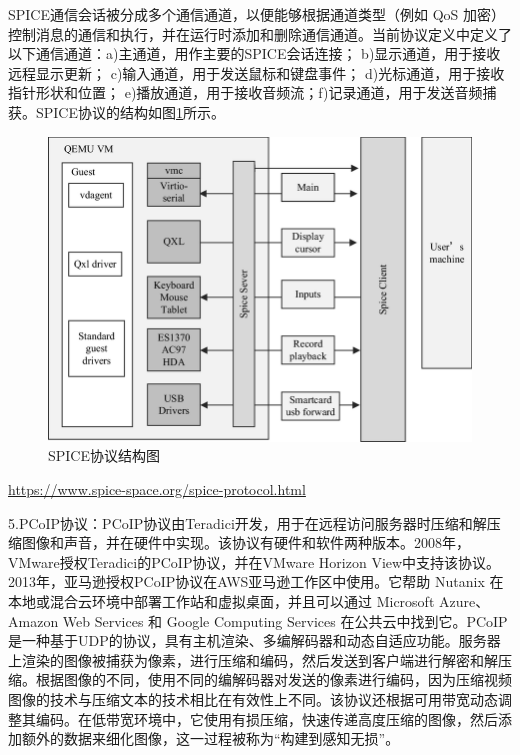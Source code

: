 \documentclass[a4paper,twoside]{scrbook}
\begin{document}
\begin{CJK}{UTF8}{gbsn}
SPICE通信会话被分成多个通信通道，以便能够根据通道类型（例如 QoS 加密）控制消息的通信和执行，并在运行时添加和删除通信通道。当前协议定义中定义了以下通信通道：a)主通道，用作主要的SPICE会话连接； b)显示通道，用于接收远程显示更新； c)输入通道，用于发送鼠标和键盘事件； d)光标通道，用于接收指针形状和位置； e)播放通道，用于接收音频流；f)记录通道，用于发送音频捕获。SPICE协议的结构如图\ref{fig:Architecture-of-SPICE-protocol}所示。
\begin{figure}[!htbp]
\centering
\includegraphics[width=1\textwidth]{Figures/Architecture-of-SPICE-protocol.png}
\caption{SPICE协议结构图}
\label{fig:Architecture-of-SPICE-protocol}
\end{figure}

\url{https://www.spice-space.org/spice-protocol.html}

5.PCoIP协议：PCoIP协议由Teradici开发，用于在远程访问服务器时压缩和解压缩图像和声音，并在硬件中实现。该协议有硬件和软件两种版本。2008年，VMware授权Teradici的PCoIP协议，并在VMware Horizon View中支持该协议。2013年，亚马逊授权PCoIP协议在AWS亚马逊工作区中使用。它帮助 Nutanix 在本地或混合云环境中部署工作站和虚拟桌面，并且可以通过 Microsoft Azure、Amazon Web Services 和 Google Computing Services 在公共云中找到它。PCoIP是一种基于UDP的协议，具有主机渲染、多编解码器和动态自适应功能。服务器上渲染的图像被捕获为像素，进行压缩和编码，然后发送到客户端进行解密和解压缩。根据图像的不同，使用不同的编解码器对发送的像素进行编码，因为压缩视频图像的技术与压缩文本的技术相比在有效性上不同。该协议还根据可用带宽动态调整其编码。在低带宽环境中，它使用有损压缩，快速传递高度压缩的图像，然后添加额外的数据来细化图像，这一过程被称为“构建到感知无损”。


\end{CJK}
\end{document}
